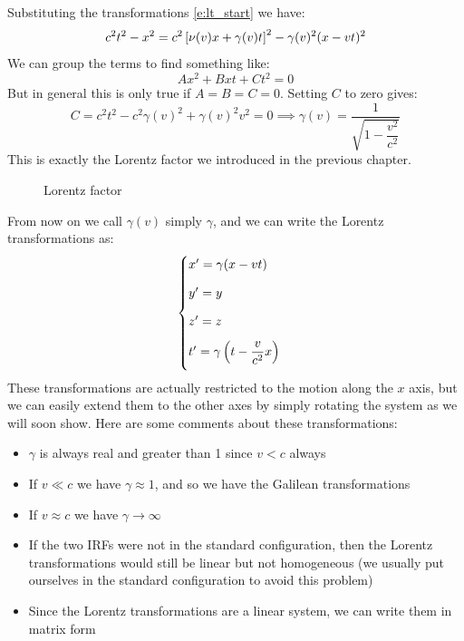 Substituting the transformations \eqref{e:lt_start} we have:
\begin{equation}
  c^2 t^2 - x^2 = c^2 \left[\nu(v)x + \gamma(v)t\right]^2 - \gamma(v)^2(x - vt)^2
\end{equation}
We can group the terms to find something like:
\begin{equation}
  Ax^2 + Bxt + Ct^2 = 0
\end{equation}
But in general this is only true if $A=B=C=0$. Setting $C$ to zero gives:
\begin{equation}
  C = c^2 t^2 - c^2\gamma(v)^2 + \gamma(v)^2v^2 = 0 \implies \gamma(v) = \dfrac{1}{\sqrt{1 - \dfrac{v^2}{c^2}}}
\end{equation}
This is exactly the Lorentz factor we introduced in the previous chapter.
\begin{figure}[H]
  \centering
  
  \caption{Lorentz factor}
\end{figure}
From now on we call $\gamma(v)$ simply $\gamma$, and we can write the Lorentz transformations as:
\begin{equation} \label{e:lt}
  \begin{cases}
    x' = \gamma(x - vt) \\[8pt]
    y'=y \\[8pt]
    z'=z \\[8pt]
    t' = \gamma\left(t - \dfrac{v}{c^2}x\right) \\[8pt]
  \end{cases}
\end{equation}
These transformations are actually restricted to the motion along the $x$ axis, but we can easily extend them to the other axes by simply rotating the system as we will soon show. Here are some comments about these transformations:
\begin{itemize}
  \item $\gamma$ is always real and greater than 1 since $v<c$ always
  \item If $v \ll c$ we have $\gamma \approx 1$, and so we have the Galilean transformations
  \item If $v \approx c$ we have $\gamma \rightarrow \infty$
  \item If the two IRFs were not in the standard configuration, then the Lorentz transformations would still be linear but not homogeneous (we usually put ourselves in the standard configuration to avoid this problem)
  \item Since the Lorentz transformations are a linear system, we can write them in matrix form
\end{itemize}
